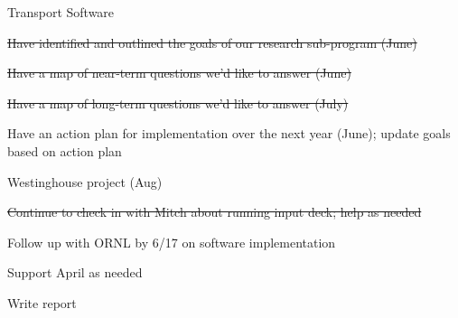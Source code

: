 \documentclass[12pt,twoside]{article}
\begin{document}
\begin{compactitem}
\item Transport Software
  \begin{compactitem}
  \item \st{Have identified and outlined the goals of our research sub-program (June)}
  \item \st{Have a map of near-term questions we'd like to answer (June)}
  \item \st{Have a map of long-term questions we'd like to answer (July)}
  \item Have an action plan for implementation over the next year (June); update goals based on action plan
  \end{compactitem}
\item Westinghouse project (Aug)
  \begin{compactitem}
  \item \st{Continue to check in with Mitch about running input deck; help as needed}
  \item Follow up with ORNL by 6/17 on software implementation
  \item Support April as needed
  \item Write report
  \end{compactitem}
\end{compactitem}
\end{document}
